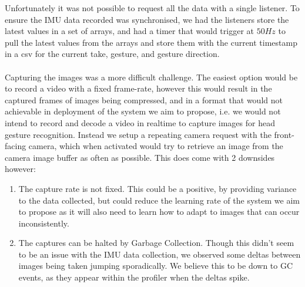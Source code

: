 Unfortunately it was not possible to request all the data with a single listener. To ensure the IMU data recorded was synchronised, we had the listeners store the latest values in a set of arrays, and had a timer that would trigger at $50Hz$ to pull the latest values from the arrays and store them with the current timestamp in a csv for the current take, gesture, and gesture direction.
\\\\
Capturing the images was a more difficult challenge.
The easiest option would be to record a video with a fixed frame-rate, however this would result in the captured frames of images being compressed, and in a format that would not achievable in deployment of the system we aim to propose, i.e. we would not intend to record and decode a video in realtime to capture images for head gesture recognition.
Instead we setup a repeating camera request with the front-facing camera, which when activated would try to retrieve an image from the camera image buffer as often as possible. This does come with 2 downsides however: 
\begin{enumerate}
    \item The capture rate is not fixed. This could be a positive, by providing variance to the data collected, but could reduce the learning rate of the system we aim to propose as it will also need to learn how to adapt to images that can occur inconsistently.
    \item The captures can be halted by Garbage Collection. Though this didn't seem to be an issue with the IMU data collection, we observed some deltas between images being taken jumping sporadically. We believe this to be down to GC events, as they appear within the profiler when the deltas spike.
\end{enumerate} 

